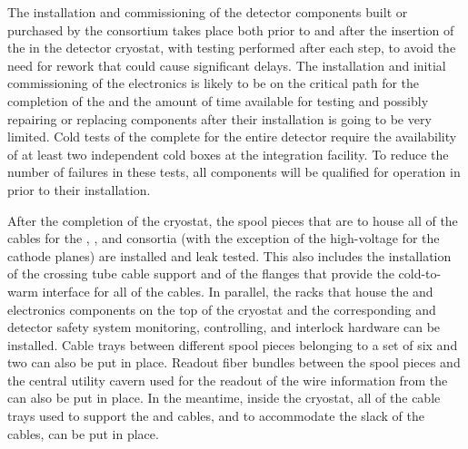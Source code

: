 The installation and commissioning of the detector components built or
purchased by the  consortium takes place both prior to
and after the insertion of the  in the
detector cryostat, with testing performed after each step, to avoid the
need for rework that could cause significant delays. The installation and
initial commissioning of the  electronics is likely to be on the critical
path for the completion of the  and the amount of
time available for testing and possibly repairing or replacing components
after their installation is going to be very limited. Cold tests of the complete
 for the entire detector require the
availability of at least two independent cold boxes at the integration facility.
To reduce the number of failures in these tests, all  components will
be qualified for operation in \lar prior to their installation.

After the completion of the cryostat, the spool pieces that are to house all of
the cables for the , , and  consortia (with the exception of the
high-voltage \fdth for the cathode planes) are installed and leak tested.
This also includes the installation of the crossing tube cable support and of
the flanges that provide the cold-to-warm interface for all of the cables.
In parallel, the racks that house the  and  electronics components on
the top of the cryostat and the corresponding  and detector safety
system monitoring, controlling, and interlock hardware can be installed.
Cable trays between different spool pieces belonging to a set of six 
and two  can also be put in place. Readout fiber bundles between the
spool pieces and the central utility cavern used for the readout of the wire
information from the  can also be put in place. In the meantime, inside
the cryostat, all of the cable trays used to support the  and  cables, and
to accommodate the slack of the cables, can be put in place.

